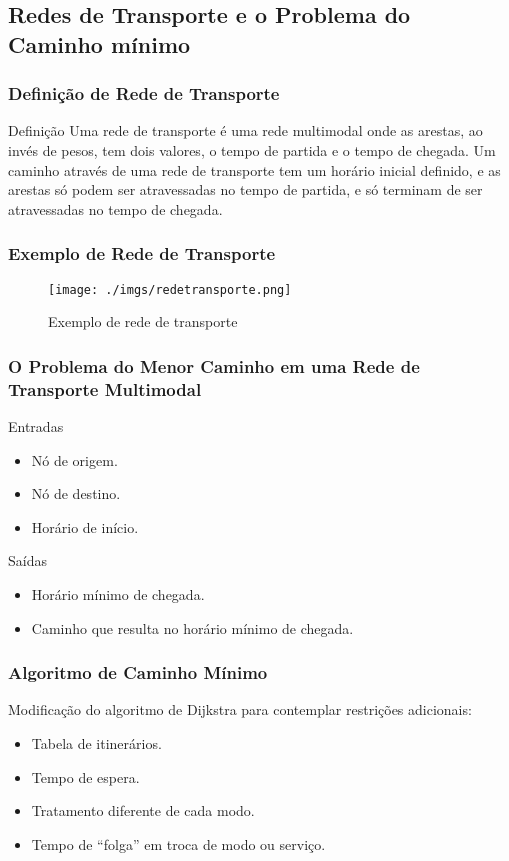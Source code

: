 \subsection{Redes de Transporte e o Problema do Caminho mínimo}
\frame
{
\frametitle{Definição de Rede de Transporte}
\begin{block}{Definição}
Uma rede de transporte é uma rede multimodal onde as arestas, ao invés de pesos, tem dois valores, o tempo de partida e o tempo de chegada. Um caminho através de uma rede de transporte tem um horário inicial definido, e as arestas só podem ser atravessadas no tempo de partida, e só terminam de ser atravessadas no tempo de chegada.
\end{block}
}

\frame
{
\frametitle{Exemplo de Rede de Transporte}
	\begin{figure}
		\texttt{[image: ./imgs/redetransporte.png]}
		\caption{Exemplo de rede de transporte}
	\end{figure}
}

\frame
{
\frametitle{O Problema do Menor Caminho em uma Rede de Transporte Multimodal}
\begin{exampleblock}{Entradas}
	\begin{itemize}
	\item Nó de origem.
	\item Nó de destino.
	\item Horário de início.
	\end{itemize}
\end{exampleblock}

\begin{alertblock}{Saídas}
	\begin{itemize}
	\item Horário mínimo de chegada.
	\item Caminho que resulta no horário mínimo de chegada.
	\end{itemize}
\end{alertblock}
}

\frame
{
\frametitle{Algoritmo de Caminho Mínimo}
Modificação do algoritmo de Dijkstra para contemplar restrições adicionais:
	\begin{itemize}
	\item Tabela de itinerários.
	\item Tempo de espera.
	\item Tratamento diferente de cada modo.
	\item Tempo de ``folga'' em troca de modo ou serviço.
	\end{itemize}
}
